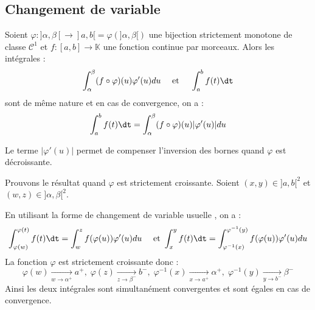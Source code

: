 \documentclass[a4paper,10pt]{report}
\begin{document}
\subsection{Changement de variable}

\begin{thm} Soient $\varphi : ]\alpha, \beta[ \rightarrow ]a,b[= \varphi(]\alpha,\beta[)$ une bijection strictement monotone de classe $\mathcal{C}^1$ et $f : [a,b] \rightarrow \mathbb{K}$ une fonction continue par morceaux. Alors les intégrales :
$$  \int_{\alpha}^{\beta} (f \circ \varphi)(u) \varphi'(u) du \quad \hbox{ et } \quad \int_{a}^b f(t) \dt$$
sont de même nature et en cas de convergence, on a :
$$ \int_{a}^b f(t) \dt= \int_{\alpha}^{\beta} (f \circ \varphi)(u) \vert \varphi'(u) \vert du$$
\end{thm}

\begin{rem} Le terme $\vert \varphi'(u) \vert$ permet de compenser l'inversion des bornes quand $\varphi$ est décroissante.
\end{rem}

\medskip

\begin{preuve} Prouvons le résultat quand $\varphi$ est strictement croissante. Soient $(x,y) \in ]a,b[^2$ et $(w,z) \in ]\alpha, \beta[^2$. 

En utilisant la forme de changement de variable \og usuelle \fg, on a :
$$ \int_{\varphi(w)}^{\varphi(t)} f(t) \dt = \int_{w}^{z} f (\varphi(u)) \varphi'(u) du \quad \hbox{ et } \int_{x}^{y} f(t) \dt = \int_{\varphi^{-1}(x)}^{\varphi^{-1}(y)} f (\varphi(u)) \varphi'(u) du$$
La fonction $\varphi$ est strictement croissante donc :
$$ \varphi(w) \underset{w \rightarrow \alpha^+}{\rightarrow} a^+, \; \varphi(z) \underset{z \rightarrow \beta^-}{\rightarrow} b^-, \; \varphi^{-1}(x) \underset{x \rightarrow a^+}{\rightarrow} \alpha^+, \; \varphi^{-1}(y) \underset{y \rightarrow b^-}{\rightarrow} \beta^-$$
Ainsi les deux intégrales sont simultanément convergentes et sont égales en cas de convergence.

\end{preuve} 

%
\end{document}
